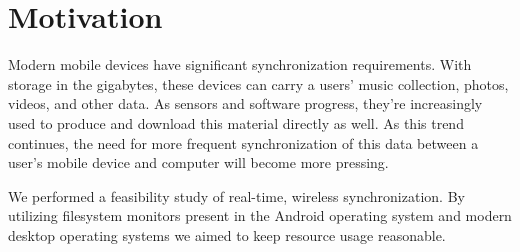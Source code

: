 \section{Motivation}
\label{sec:Motivation}
Modern mobile devices have significant synchronization requirements.  With storage in the gigabytes, these devices can carry a users' music collection, photos, videos, and other data.  As sensors and software progress, they're increasingly used to produce and download this material directly as well.  As this trend continues, the need for more frequent synchronization of this data between a user's mobile device and computer will become more pressing.

We performed a feasibility study of real-time, wireless synchronization.  By utilizing filesystem monitors present in the Android operating system and modern desktop operating systems we aimed to keep resource usage reasonable.